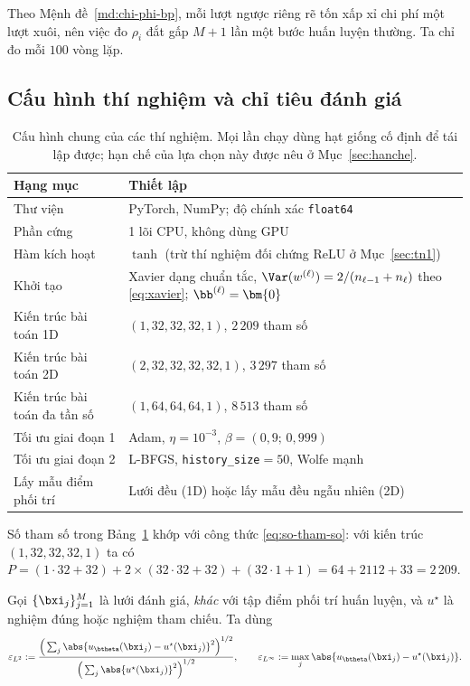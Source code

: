 Theo Mệnh đề~\ref{md:chi-phi-bp}, mỗi lượt ngược riêng rẽ tốn xấp xỉ chi phí một
lượt xuôi, nên việc đo $\rho_i$ đắt gấp $M+1$ lần một bước huấn luyện thường. Ta
chỉ đo mỗi $100$ vòng lặp.
 
\subsection{Cấu hình thí nghiệm và chỉ tiêu đánh giá}
\label{ssec:cauhinh}
 
\begin{table}[H]
\centering
\caption{Cấu hình chung của các thí nghiệm. Mọi lần chạy dùng hạt giống cố định
để tái lập được; hạn chế của lựa chọn này được nêu ở Mục~\ref{sec:hanche}.}
\label{tab:cauhinh}
\small
\begin{tabular}{@{}p{4.3cm}p{9.2cm}@{}}
\toprule
\textbf{Hạng mục} & \textbf{Thiết lập} \\
\midrule
Thư viện & PyTorch, NumPy; độ chính xác \texttt{float64} \\
Phần cứng & 1 lõi CPU, không dùng GPU \\
Hàm kích hoạt & $\tanh$ (trừ thí nghiệm đối chứng ReLU ở Mục~\ref{sec:tn1}) \\
Khởi tạo & Xavier dạng chuẩn tắc, $\Var(w^{(\ell)}) = 2/(n_{\ell-1}+n_{\ell})$
  theo \eqref{eq:xavier}; $\bb^{(\ell)} = \bm{0}$ \\
Kiến trúc bài toán 1D & $(1,32,32,32,1)$, $2\,209$ tham số \\
Kiến trúc bài toán 2D & $(2,32,32,32,32,1)$, $3\,297$ tham số \\
Kiến trúc bài toán đa tần số & $(1,64,64,64,1)$, $8\,513$ tham số \\
Tối ưu giai đoạn 1 & Adam, $\eta = 10^{-3}$, $\beta = (0{,}9;\,0{,}999)$ \\
Tối ưu giai đoạn 2 & L-BFGS, \texttt{history\_size}${}=50$, Wolfe mạnh \\
Lấy mẫu điểm phối trí & Lưới đều (1D) hoặc lấy mẫu đều ngẫu nhiên (2D) \\
\bottomrule
\end{tabular}
\end{table}
 
Số tham số trong Bảng~\ref{tab:cauhinh} khớp với công thức \eqref{eq:so-tham-so}:
với kiến trúc $(1,32,32,32,1)$ ta có
$P = (1\cdot32+32) + 2\times(32\cdot32+32) + (32\cdot1+1) = 64 + 2112 + 33
= 2\,209$.
 
\begin{definition}
\label{dn:chi-tieu}
Gọi $\{\bxi_j\}_{j=1}^{M}$ là lưới đánh giá, \emph{khác} với tập điểm phối trí
huấn luyện, và $u^{\star}$ là nghiệm đúng hoặc nghiệm tham chiếu. Ta dùng
\begin{equation}
\varepsilon_{L^2}
 := \frac{\Big(\sum_{j}\abs{u_{\btheta}(\bxi_j)
      - u^{\star}(\bxi_j)}^2\Big)^{1/2}}
         {\Big(\sum_{j}\abs{u^{\star}(\bxi_j)}^2\Big)^{1/2}},
\qquad
\varepsilon_{L^{\infty}}
 := \max_{j}\abs{u_{\btheta}(\bxi_j) - u^{\star}(\bxi_j)}.
\label{eq:chi-tieu}
\end{equation}
\end{definition}
 
